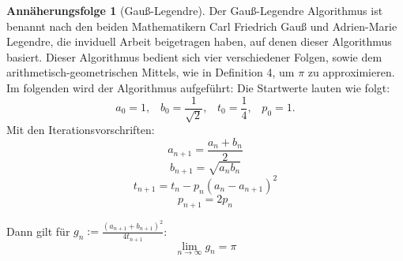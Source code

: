\documentclass{scrartcl}
\theoremstyle{definition}
\newtheorem{approximation sequence}{Annäherungsfolge}
\begin{document}
\begin{approximation sequence}[Gauß-Legendre]

Der Gauß-Legendre Algorithmus ist benannt nach den beiden Mathematikern Carl
Friedrich Gauß und Adrien-Marie Legendre, die inviduell Arbeit beigetragen
haben, auf denen dieser Algorithmus basiert. Dieser Algorithmus bedient sich
vier verschiedener Folgen, sowie dem arithmetisch-geometrischen Mittels, wie in
Definition 4, um \(\pi\) zu approximieren. Im folgenden wird der Algorithmus
aufgeführt: \cite{AGM-Gauß-Legendre} Die Startwerte lauten wie folgt:
\begin{equation*}
    a_0 = 1, \;\;\; b_0 = \frac{1}{\sqrt{2}}, \;\;\; t_0 = \frac{1}{4}, \;\;\; p_0 = 1.
\end{equation*}
Mit den Iterationsvorschriften:
\[a_{n+1} = \frac{a_n + b_n}{2} \]
\[b_{n+1} = \sqrt{a_nb_n} \]
\[t_{n+1} = t_n - p_n(a_n - a_{n+1})^2 \]
\[p_{n+1} = 2p_n \]

Dann gilt für \(g_n := \frac{(a_{n+1} + b_{n+1})^2}{4t_{n+1}}\):
\begin{equation*}
    \lim_{n \to \infty}g_n = \pi
\end{equation*}


\end{approximation sequence}
\end{document}
